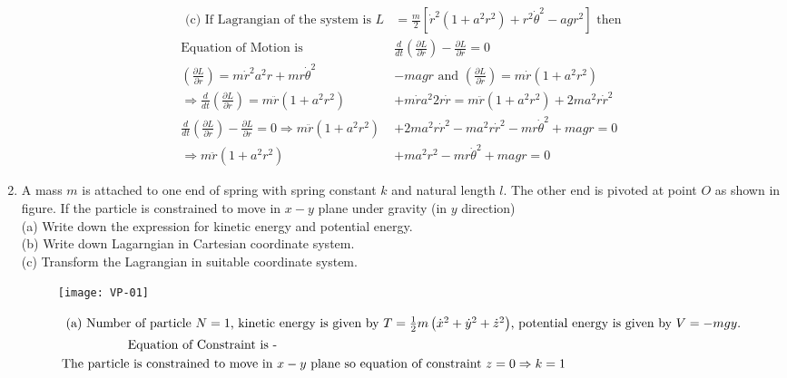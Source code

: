\begin{enumerate}
\begin{answer}
\begin{align*}
		\text{	(c) If Lagrangian of the system is } L&=\frac{m}{2}\left[\dot{r}^{2}\left(1+a^{2} r^{2}\right)+r^{2} \dot{\theta}^{2}-a g r^{2}\right]\text{ then}\\
		\text{Equation of Motion is }&\frac{d}{d t}\left(\frac{\partial L}{\partial \dot{r}}\right)-\frac{\partial L}{\partial r}=0\\
		\left(\frac{\partial L}{\partial r}\right)=m \dot{r}^{2} a^{2} r+m r \dot{\theta}^{2}&-m a g r\text{ and }\left(\frac{\partial L}{\partial \dot{r}}\right)=m \dot{r}\left(1+a^{2} r^{2}\right)\\
		\Rightarrow \frac{d}{d t}\left(\frac{\partial L}{\partial \dot{r}}\right)=m \ddot{r}\left(1+a^{2} r^{2}\right)&+m \dot{r} a^{2} 2 r \dot{r}=m \ddot{r}\left(1+a^{2} r^{2}\right)+2 m a^{2} r \dot{r}^{2}\\
		\frac{d}{d t}\left(\frac{\partial L}{\partial \dot{r}}\right)-\frac{\partial L}{\partial r}=0 \Rightarrow m \ddot{r}\left(1+a^{2} r^{2}\right)&+2 m a^{2} r \dot{r}^{2}-m a^{2} r \dot{r}^{2}-m r \dot{\theta}^{2}+m a g r=0\\
		\Rightarrow m \ddot{r}\left(1+a^{2} r^{2}\right)&+m a^{2} r^{2}-m r \dot{\theta}^{2}+m a g r=0
		\end{align*}
	\end{answer}
	\item A mass $m$ is attached to one end of spring with spring constant $k$ and natural length $l$. The other end is pivoted at point $O$ as shown in figure. If the particle is constrained to move in $x-y$ plane under gravity (in $y$ direction)\\
		(a) Write down the expression for kinetic energy and potential energy.\\
		(b) Write down Lagarngian in Cartesian coordinate system.\\
		(c) Transform the Lagrangian in suitable coordinate system.\\
		\begin{figure}[H]
			\centering
			\texttt{[image: VP-01]}
		\end{figure}
	\begin{answer}
		\begin{align*}
		\intertext{ (a) Number of particle $N=1$, kinetic energy is given by $T=\frac{1}{2} m\left(\dot{x}^{2}+\dot{y}^{2}+\dot{z}^{2}\right)$, potential energy is given by $V=-m g y .$}
		\text{Equation of Constraint is -}\\
		\text{The particle is constrained to move in }&x-y\text{ plane so equation of constraint }z=0 \Rightarrow k=1\\

\end{align*}
\end{answer}
\end{enumerate}
